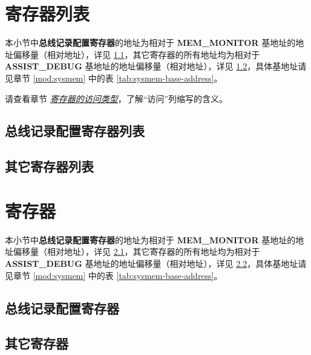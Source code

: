 \documentclass[main\_\_CN.tex]{subfiles}
\begin{document}


\clearpage
\hypertarget{dbgassist-reg-summ}{}
\section{寄存器列表}
\label{sec:dbgassist-reg-summ}

本小节中\textbf{总线记录配置寄存器}的地址为相对于 \textbf{MEM\_MONITOR} 基地址的地址偏移量（相对地址），详见 \ref{sec:dbgassist-mem-monitor-reg-summ}，其它寄存器的所有地址均为相对于 \textbf{ASSIST\_DEBUG} 基地址的地址偏移量（相对地址），详见 \ref{sec:dbgassist-bus-monitor-reg-summ}，具体基地址请见章节 \ref{mod:sysmem} \textit{} 中的表 \ref{tab:sysmem-base-address}。

请查看章节 \hyperref[glossary-access-types]{\textit{寄存器的访问类型}}，了解“访问”列缩写的含义。

\subsection{总线记录配置寄存器列表}
\label{sec:dbgassist-mem-monitor-reg-summ}



\subsection{其它寄存器列表}
\label{sec:dbgassist-bus-monitor-reg-summ}







\clearpage
\section{寄存器}

本小节中\textbf{总线记录配置寄存器}的地址为相对于 \textbf{MEM\_MONITOR} 基地址的地址偏移量（相对地址），详见 \ref{sec:dbgassist-mem-monitor-reg}，其它寄存器的所有地址均为相对于 \textbf{ASSIST\_DEBUG} 基地址的地址偏移量（相对地址），详见 \ref{sec:dbgassist-bus-monitor-reg}，具体基地址请见章节 \ref{mod:sysmem} \textit{} 中的表 \ref{tab:sysmem-base-address}。

\subsection{总线记录配置寄存器}
\label{sec:dbgassist-mem-monitor-reg}



\subsection{其它寄存器}
\label{sec:dbgassist-bus-monitor-reg}


\end{document}
